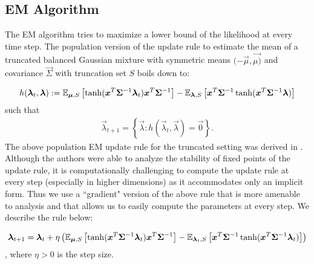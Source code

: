 \subsection{EM Algorithm}
The EM algorithm tries to maximize a lower bound of the likelihood at every time step. The population version of the update rule to estimate the mean of a truncated balanced Gaussian mixture with symmetric means $(-\vec{\mu},\vec{\mu)}$ and covariance $\vec{\Sigma}$ with truncation set $S$ boils down to:

\begin{align}\label{eq:EM-rule}
	h(\bm{\lambda}_t,\bm{\lambda}):=\mathbb{E}_{\bm{\mu},S}\left[\tanh(\bm{x}^T\bm{\Sigma}^{-1}\bm{\lambda}_t)\bm{x}^T\bm{\Sigma}^{-1}\right]-\mathbb{E}_{\bm{\lambda},S}\left[\bm{x}^T\bm{\Sigma}^{-1}\tanh(\bm{x}^T\bm{\Sigma}^{-1}\bm{\lambda})\right]
\end{align}
such that
\begin{align}\label{eq:dyn}
		\vec{\lambda}_{t+1}=\left\{\vec{\lambda}:h(\vec{\lambda}_t,\vec{\lambda})=\vec{0}\right\}.
\end{align}	
The above population EM update rule for the truncated setting was derived in  \cite{Nagarajan and Panageas}. Although the authors were able to analyze the stability of fixed points of the update rule, it is computationally challenging to compute the update rule at every step (especially in higher dimensions) as it accommodates only an implicit form. Thus we use a ``gradient" version of the above rule that is more amenable to analysis and that allows us to easily compute the parameters at every step. We describe the rule below:

\begin{align}\label{eq:grad-EM-rule}
\bm{\lambda}_{t+1}=\bm{\lambda}_{t}+\eta\left(\mathbb{E}_{\bm{\mu},S}\left[\tanh(\bm{x}^T\bm{\Sigma}^{-1}\bm{\lambda}_t)\bm{x}^T\bm{\Sigma}^{-1}\right]-\mathbb{E}_{\bm{\lambda}_{t},S}\left[\bm{x}^T\bm{\Sigma}^{-1}\tanh(\bm{x}^T\bm{\Sigma}^{-1}\bm{\lambda}_{t})\right]\right)
\end{align}
, where $\eta > 0$ is the step size. 

\begin{comment}
\begin{remark}[Even function $S(\vec{x})$, Symmetric set $S$]
	When the truncation function $S$ is even or the truncation set $S$ is symmetric, we can show (Appendix \ref{app:symtrunc-set}) that the EM update rule accommodates a simpler form, given by:
		\begin{align}
			h(\vec{\lambda}_t,\vec{\lambda}):=\EE_{\vec{\mu},S}\left[\tanh(\vec{x}^T\vec{\Sigma}^{-1}\vec{\lambda}_t)\vec{x}^T\vec{\Sigma}^{-1}\right]-\vec{\lambda}^T\vec{\Sigma}^{-1}
		\end{align}
		and
		\begin{align}
			\vec{\lambda}_{t+1}=\EE_{\vec{\mu},S}\left[\tanh(\vec{x}^T\vec{\Sigma}^{-1}\vec{\lambda}_t)\vec{x}\right].
		\end{align}
	
\end{remark}
\end{comment}

